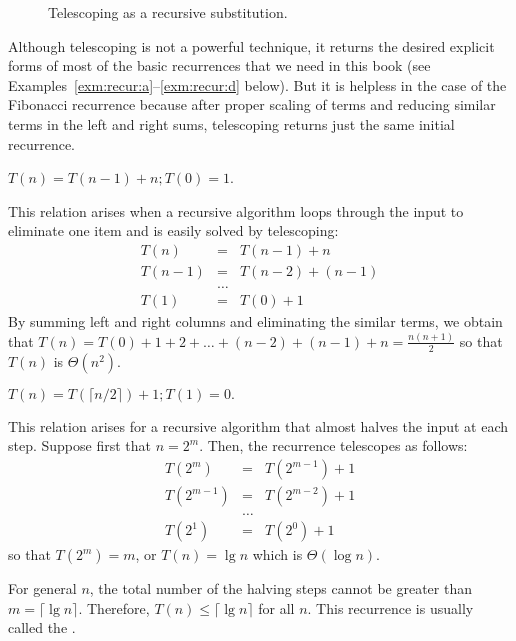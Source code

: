 \begin{figure}[htb!]
 \centerline{}
    \caption{\label{f:telescope}Telescoping as a recursive substitution.}
\end{figure}

Although telescoping is not a powerful technique, 
it returns the desired explicit 
forms of most of the basic recurrences that we need in this book (see 
Examples~\ref{exm:recur:a}--\ref{exm:recur:d} below). But
it is helpless in the case of the Fibonacci 
recurrence because after proper scaling of terms
and reducing similar terms in the left and right sums,
telescoping returns just the same initial recurrence.


\begin{Example} \label{exm:recur:a}
$ T(n)=T(n-1)+n; T(0)=1$.

This relation arises when a recursive algorithm loops 
through the input to eliminate one item and 
is easily solved by telescoping:
\begin{eqnarray*}
    T(n) & = & T(n-1) + n\\
    T(n-1) & = & T(n-2) + (n-1)\\
           &\ldots & \\
    T(1)   & = & T(0) + 1
\end{eqnarray*}
By summing left and right columns and eliminating the 
similar terms, we obtain that
\(
T(n) = T(0)+1+2+\ldots+(n-2)+(n-1)+n = \frac{n(n+1)}{2}\) 
so that \(T(n)\) is \(\Theta(n^2 )\).
\end{Example}

\begin{Example} \label{exm:recur:b}
$T(n)=T\left (\lceil n/2 \rceil\right )+1; T(1)=0.$

This relation arises for a
recursive algorithm that almost halves the input 
at each step. Suppose first that $n=2^{m}$. Then,
the recurrence telescopes as follows:
\begin{eqnarray*}
    T(2^{m}) & = & T(2^{m-1}) + 1\\
    T(2^{m-1}) & = & T(2^{m-2}) + 1\\
           &\ldots & \\
    T(2^{1})   & = & T(2^{0}) + 1
\end{eqnarray*}
so that $T(2^{m}) = m$, or $T(n) = \lg n$ which is $\Theta(\log n)$.

For general $n$, the total number of the halving steps cannot be greater than 
\(m=\lceil \lg n \rceil\). Therefore, $T(n) \le \lceil \lg n\rceil$ for all $n$. 
This recurrence is usually called the .
\end{Example}

